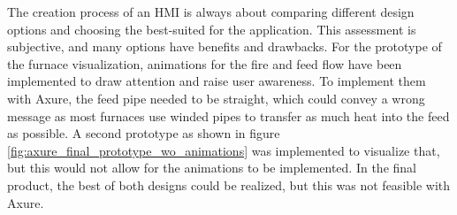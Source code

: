 The creation process of an \ac{HMI} is always about comparing different design options and choosing the best-suited for the application. This assessment is subjective, and many options have benefits and drawbacks. For the prototype of the furnace visualization, animations for the fire and feed flow have been implemented to draw attention and raise user awareness. To implement them with Axure, the feed pipe needed to be straight, which could convey a wrong message as most furnaces use winded pipes to transfer as much heat into the feed as possible. A second prototype as shown in figure \ref{fig:axure_final_prototype_wo_animations} was implemented to visualize that, but this would not allow for the animations to be implemented. In the final product, the best of both designs could be realized, but this was not feasible with Axure.

